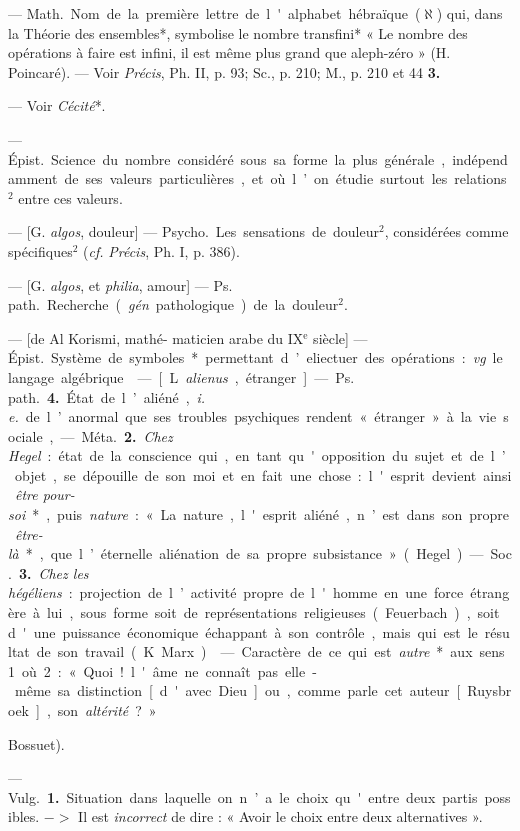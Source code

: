 \begin{itemize}[leftmargin=1cm, label=, itemsep=1pt]
{ — \si{Math.} Nom de la première
lettre de l'alphabet hébraïque ($\aleph$)
qui, dans la Théorie des ensembles*,
symbolise le nombre transfini*
« Le nombre des opérations à faire
est infini, il est même plus grand
que aleph-zéro » (H. Poincaré). —
Voir {\it Précis}, Ph. II, p. 93; Sc., p. 210;
M., p. 210 et 44 {\bf 3.}

 — Voir {\it Cécité}*.

 — \si{Épist.} Science du nombre
considéré sous sa forme la plus générale, indépendamment de ses valeurs
particulières, et où l’on étudie surtout les relations$^2$ entre ces valeurs.

 — [G. {\it algos}, douleur] — \si{Psycho.} Les sensations de
douleur$^2$, considérées comme spécifiques$^2$ ({\it cf.}  {\it Précis}, Ph. I, p. 386).

 — [G. {\it algos}, et {\it philia}, amour]
— \si{Ps. path.} Recherche ({\it gén}. pathologique) de la douleur$^2$.

 — [de Al Korismi, mathé-
maticien arabe du {\footnotesize IX}$^\text{e}$ siècle] — \si{Épist.}
Système de symboles* permettant
d’eliectuer des opérations : {\it vg}. le
langage algébrique.

 — [L. {\it alienus}, étranger] —
\si{Ps. path.} {\bf 4.} État de l’aliéné, {\it i. e.} de
l’anormal que ses troubles psychiques rendent « étranger » à la
vie sociale,

— \si{Méta.} {\bf 2.} {\it Chez Hegel} : état de la
conscience qui, en tant qu'opposition du sujet et de l’objet,
se dépouille de son moi et en fait une
chose: l'esprit devient ainsi {\it être
pour-soi}*, puis {\it nature} : « La nature,
l'esprit aliéné, n’est dans son propre
{\it être-là}*, que l’éternelle aliénation de
sa propre subsistance » (Hegel).

— \si{Soc.} {\bf 3.} {\it Chez les hégéliens} : projection de l’activité propre de l'homme
en une force étrangère à lui, sous
forme soit de représentations religieuses (Feuerbach), soit d'une
puissance économique échappant à
son contrôle, mais qui est le résultat
de son travail (K. Marx).

 — Caractère de ce qui est
{\it autre}* aux sens 1 où 2 : « Quoi!
l'âme ne connaît pas elle-même sa
distinction [d'avec Dieu] ou, comme
parle cet auteur [Ruysbroek], son
{\it altérité} ? » {Bossuet).

 — \si{Vulg.} {\bf 1.} Situation
dans laquelle on n’a le choix qu'entre
deux partis possibles. $->$ Il est
{\it incorrect} de dire : « Avoir le choix
entre deux alternatives ».

}}
\end{itemize}
